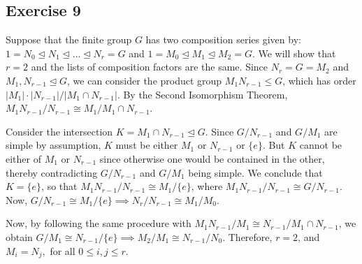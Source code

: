 \subsection*{Exercise 9}
Suppose that the finite group $G$ has two composition series given by: $1 = N_0 \trianglelefteq N_1 \trianglelefteq ... \trianglelefteq N_r = G$ and $1 = M_0 \trianglelefteq M_1 \trianglelefteq M_2 = G$. We will show that $r = 2$ and the lists of composition factors are the same. Since $N_r = G = M_2$ and $M_1, N_{r-1} \trianglelefteq G$, we can consider the product group $M_1N_{r-1} \le G$, which has order $|M_1|\cdot|N_{r-1}|/|M_1 \cap N_{r-1}|$. By the Second Isomorphism Theorem, $M_1N_{r-1}/N_{r-1} \cong M_1/M_1\cap N_{r-1}$.

Consider the intersection $K = M_1 \cap N_{r-1} \trianglelefteq G$. Since $G/N_{r-1}$ and $G/M_1$ are simple by assumption, $K$ must be either $M_1$ or $N_{r-1}$ or $\{e\}$. But $K$ cannot be either of $M_1$ or $N_{r-1}$ since otherwise one would be contained in the other, thereby contradicting $G/N_{r-1}$ and $G/M_1$ being simple. We conclude that $K = \{e\}$, so that $M_1N_{r-1}/N_{r-1} \cong M_1/\{e\}$, where $M_1N_{r-1}/N_{r-1} \cong G/N_{r-1}$. Now, $G/N_{r-1} \cong M_1/\{e\} \implies N_r/N_{r-1} \cong M_1/M_0$. 

Now, by following the same procedure with $M_1N_{r-1}/M_1 \cong N_{r-1}/M_1\cap N_{r-1}$, we obtain $G/M_1 \cong N_{r-1}/\{e\} \implies M_2/M_1 \cong N_{r-1}/N_0$. Therefore, $r = 2$, and $M_i = N_j,$ for all $0 \le i,j \le r$.